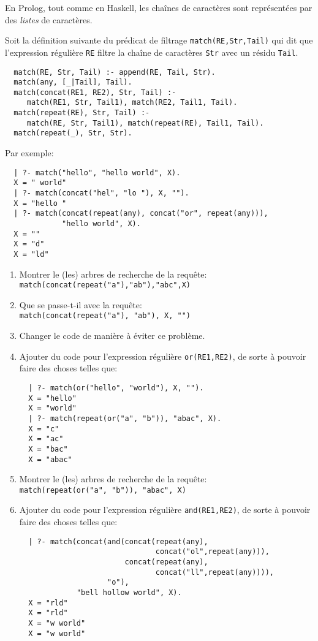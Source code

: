\begin{Exercise}
  \label{ex:prolog_regex}
En Prolog, tout comme en Haskell, les chaînes de caractères sont
représentées par des \emph{listes} de caractères.

Soit la définition suivante du prédicat de filtrage
\verb+match(RE,Str,Tail)+ qui dit que l'expression régulière \texttt{RE}
filtre la chaîne de caractères \texttt{Str} avec un résidu \texttt{Tail}.

\begin{verbatim}
  match(RE, Str, Tail) :- append(RE, Tail, Str).
  match(any, [_|Tail], Tail).
  match(concat(RE1, RE2), Str, Tail) :-
     match(RE1, Str, Tail1), match(RE2, Tail1, Tail).
  match(repeat(RE), Str, Tail) :-
     match(RE, Str, Tail1), match(repeat(RE), Tail1, Tail).
  match(repeat(_), Str, Str).
\end{verbatim}
Par exemple:
\begin{verbatim}
  | ?- match("hello", "hello world", X).
  X = " world"
  | ?- match(concat("hel", "lo "), X, "").
  X = "hello "
  | ?- match(concat(repeat(any), concat("or", repeat(any))),
             "hello world", X).
  X = ""
  X = "d"
  X = "ld"
\end{verbatim}

\begin{enumerate}
\item Montrer le (les) arbres de recherche de la requête: \\
  \verb+match(concat(repeat("a"),"ab"),"abc",X)+
\item Que se passe-t-il avec la requête: \\
  \verb+match(concat(repeat("a"), "ab"), X, "")+
\item Changer le code de manière à éviter ce problème.
\item Ajouter du code pour l'expression régulière \texttt{or(RE1,RE2)}, de
  sorte à pouvoir faire des choses telles que:
\begin{verbatim}
  | ?- match(or("hello", "world"), X, "").
  X = "hello"
  X = "world"
  | ?- match(repeat(or("a", "b")), "abac", X).
  X = "c"
  X = "ac"
  X = "bac"
  X = "abac"
\end{verbatim}
\item Montrer le (les) arbres de recherche de la requête: \\
  \verb+match(repeat(or("a", "b")), "abac", X)+
\item Ajouter du code pour l'expression régulière \texttt{and(RE1,RE2)}, de
  sorte à pouvoir faire des choses telles que:
\begin{verbatim}
  | ?- match(concat(and(concat(repeat(any),
                               concat("ol",repeat(any))),
                        concat(repeat(any),
                               concat("ll",repeat(any)))),
                    "o"),
             "bell hollow world", X).
  X = "rld"
  X = "rld"
  X = "w world"
  X = "w world"
\end{verbatim}

\end{enumerate}
\end{Exercise}

\begin{Answer}[ref={ex:prolog_regex}]
\end{Answer}
